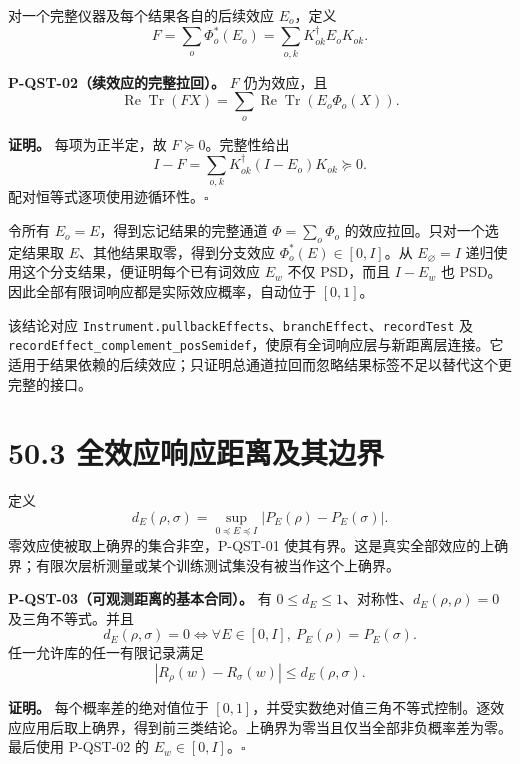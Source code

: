 \documentclass[
  11pt,
  oneside]{book}
\begin{document}
对一个完整仪器及每个结果各自的后续效应 \(E_o\)，定义 \[
F=\sum_o\Phi_o^*(E_o)=\sum_{o,k}K_{ok}^{\dagger}E_oK_{ok}.
\]

\protect\hypertarget{p-qst-02}{}{}

\textbf{P-QST-02（续效应的完整拉回）。} \(F\) 仍为效应，且 \[
\operatorname{Re}\operatorname{Tr}(FX)
=\sum_o\operatorname{Re}\operatorname{Tr}(E_o\Phi_o(X)).
\]

\textbf{证明。} 每项为正半定，故 \(F\succeq0\)。完整性给出 \[
I-F=\sum_{o,k}K_{ok}^{\dagger}(I-E_o)K_{ok}\succeq0.
\] 配对恒等式逐项使用迹循环性。\(\square\)

令所有 \(E_o=E\)，得到忘记结果的完整通道 \(\Phi=\sum_o\Phi_o\)
的效应拉回。只对一个选定结果取 \(E\)、其他结果取零，得到分支效应
\(\Phi_o^*(E)\in[0,I]\)。从 \(E_\varnothing=I\)
递归使用这个分支结果，便证明每个已有词效应 \(E_w\) 不仅 PSD，而且
\(I-E_w\) 也 PSD。因此全部有限词响应都是实际效应概率，自动位于
\([0,1]\)。

该结论对应
\texttt{Instrument.pullbackEffects}、\allowbreak \texttt{branchEffect}、\allowbreak \texttt{recordTest}
及
\texttt{recordEffect\_\allowbreak complement\_\allowbreak posSemidef}，使原有全词响应层与新距离层连接。它适用于结果依赖的后续效应；只证明总通道拉回而忽略结果标签不足以替代这个更完整的接口。

\hypertarget{ux5168ux6548ux5e94ux54cdux5e94ux8dddux79bbux53caux5176ux8fb9ux754c}{%
\section{50.3
全效应响应距离及其边界}\label{ux5168ux6548ux5e94ux54cdux5e94ux8dddux79bbux53caux5176ux8fb9ux754c}}

定义 \[
d_E(\rho,\sigma)=\sup_{0\preceq E\preceq I}|P_E(\rho)-P_E(\sigma)|.
\] 零效应使被取上确界的集合非空，P-QST-01
使其有界。这是真实全部效应的上确界；有限次层析测量或某个训练测试集没有被当作这个上确界。

\protect\hypertarget{p-qst-03}{}{}

\textbf{P-QST-03（可观测距离的基本合同）。} 有
\(0\le d_E\le1\)、对称性、\(d_E(\rho,\rho)=0\) 及三角不等式。并且 \[
d_E(\rho,\sigma)=0
\iff \forall E\in[0,I],\ P_E(\rho)=P_E(\sigma).
\] 任一允许库的任一有限记录满足 \[
|R_\rho(w)-R_\sigma(w)|\le d_E(\rho,\sigma).
\]

\textbf{证明。} 每个概率差的绝对值位于
\([0,1]\)，并受实数绝对值三角不等式控制。逐效应应用后取上确界，得到前三类结论。上确界为零当且仅当全部非负概率差为零。最后使用
P-QST-02 的 \(E_w\in[0,I]\)。\(\square\)
\end{document}
